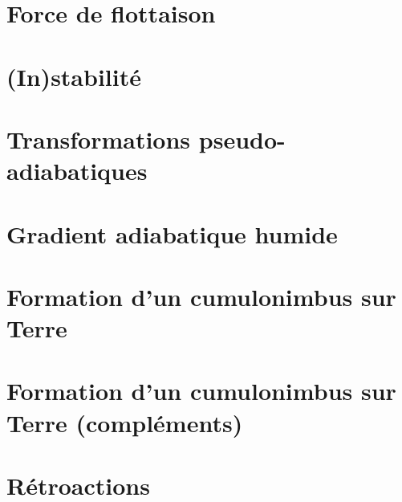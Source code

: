 \documentclass[a4paper,DIV16,10pt]{scrartcl}
\begin{document}
 \inidoc

\newpage
\section{Force de flottaison}


\newpage
\section{(In)stabilité}


\newpage
\section{Transformations pseudo-adiabatiques}


\newpage
\section{Gradient adiabatique humide}


\newpage


\newpage
\section{Formation d'un cumulonimbus sur Terre}


\newpage
\section{Formation d'un cumulonimbus sur Terre (compléments)}


\newpage
\section{Rétroactions}


%
\end{document}
